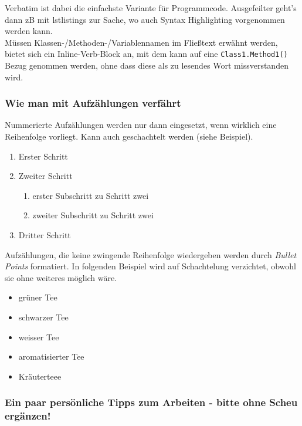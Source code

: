 Verbatim ist dabei die einfachste Variante für Programmcode. 
Ausgefeilter geht's dann zB mit lstlistings zur Sache, wo auch Syntax Highlighting vorgenommen werden kann. \\

Müssen Klassen-/Methoden-/Variablennamen im Fließtext erwähnt werden, bietet sich ein Inline-Verb-Block an, mit dem kann auf eine \verb|Class1.Method1()| Bezug genommen werden, ohne dass diese als zu lesendes Wort missverstanden wird. %

\subsubsection{Wie man mit Aufzählungen verfährt}

Nummerierte Aufzählungen werden nur dann eingesetzt, wenn wirklich eine Reihenfolge vorliegt.
Kann auch geschachtelt werden (siehe Beispiel). 

\begin{enumerate}
    \item Erster Schritt
    \item Zweiter Schritt
    \begin{enumerate}
        \item erster Subschritt zu Schritt zwei
        \item zweiter Subschritt zu Schritt zwei
    \end{enumerate}
    \item Dritter Schritt
\end{enumerate}

Aufzählungen, die keine zwingende Reihenfolge wiedergeben werden durch \textit{Bullet Points} formatiert.
In folgenden Beispiel wird auf Schachtelung verzichtet, obwohl sie ohne weiteres möglich wäre. 

\begin{itemize}
    \item grüner Tee
    \item schwarzer Tee
    \item weisser Tee
    \item aromatisierter Tee
    \item Kräuterteee
\end{itemize}

\subsubsection{Ein paar persönliche Tipps zum Arbeiten - bitte ohne Scheu ergänzen!}

